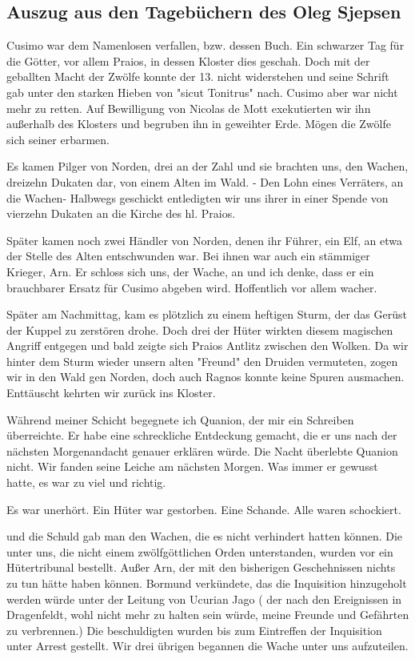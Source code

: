 \subsection{Auszug aus den Tagebüchern des Oleg Sjepsen}

Cusimo war dem Namenlosen verfallen, bzw. dessen Buch. Ein schwarzer Tag für die Götter, vor allem Praios, in dessen Kloster dies geschah. Doch mit der geballten Macht der Zwölfe konnte der 13. nicht widerstehen und seine Schrift gab unter den starken Hieben von "sicut Tonitrus" nach. Cusimo aber war nicht mehr zu retten. Auf Bewilligung von Nicolas de Mott exekutierten wir ihn außerhalb des Klosters und begruben ihn in geweihter Erde. Mögen die Zwölfe sich seiner erbarmen.\par
Es kamen Pilger von Norden, drei an der Zahl und sie brachten uns, den Wachen, dreizehn Dukaten dar, von einem Alten im Wald. - Den Lohn eines Verräters, an die Wachen- Halbwegs geschickt entledigten wir uns ihrer in einer Spende von vierzehn Dukaten an die Kirche des hl. Praios.\par
Später kamen noch zwei Händler von Norden, denen ihr Führer, ein Elf, an etwa der Stelle des Alten entschwunden war. Bei ihnen war auch ein stämmiger Krieger, Arn. Er schloss sich uns, der Wache, an und ich denke, dass er ein brauchbarer Ersatz für Cusimo abgeben wird. Hoffentlich vor allem wacher.\par
Später am Nachmittag, kam es plötzlich zu einem heftigen Sturm, der das Gerüst der Kuppel zu zerstören drohe. Doch drei der Hüter wirkten diesem magischen Angriff entgegen und bald zeigte sich Praios Antlitz zwischen den Wolken. Da wir hinter dem Sturm wieder unsern alten "Freund" den Druiden vermuteten, zogen wir in den Wald gen Norden, doch auch Ragnos konnte keine Spuren ausmachen. Enttäuscht kehrten wir zurück ins Kloster.\par
Während meiner Schicht begegnete ich Quanion, der mir ein Schreiben überreichte. Er habe eine schreckliche Entdeckung gemacht, die er uns nach der nächsten Morgenandacht genauer erklären würde. Die Nacht überlebte Quanion nicht. Wir fanden seine Leiche am nächsten Morgen. Was immer er gewusst hatte, es war zu viel und richtig.\par
Es war unerhört. Ein Hüter war gestorben. Eine Schande. Alle waren schockiert.\par
und die Schuld gab man den Wachen, die es nicht verhindert hatten können. Die unter uns, die nicht einem zwölfgöttlichen Orden unterstanden, wurden vor ein Hütertribunal bestellt. Außer Arn, der mit den bisherigen Geschehnissen nichts zu tun hätte haben können. Bormund verkündete, das die Inquisition hinzugeholt werden würde unter der Leitung von Ucurian Jago ( der nach den Ereignissen in Dragenfeldt, wohl nicht mehr zu halten sein würde, meine Freunde und Gefährten zu verbrennen.) Die beschuldigten wurden bis zum Eintreffen der Inquisition unter Arrest gestellt. Wir drei übrigen begannen die Wache unter uns aufzuteilen.\par
